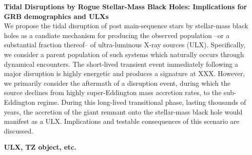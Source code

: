 {\bf Tidal Disruptions by Rogue Stellar-Mass Black Holes:  Implications for GRB demographics and ULXs}\\

We propose the tidal disruption of post main-sequence stars by stellar-mass black holes as a candiate mechanism for
producing the observed population --or a substantial fraction thereof-- of ultra-luminous X-ray sources (ULX).   Specifically, we consider a parent population of such systems which naturally occurs through dynamical encounters.  The short-lived transient event immediately following a major disruption is highly energetic and produces a signature at XXX.  However, we primarily consider the aftermath of a disruption event, during which the source declines from highly super-Eddington mass accretion rates, to the sub-Eddington regime.  During this long-lived transitional phase, lasting thousands of years, the accretion of the giant remnant onto the stellar-mass black hole would manifest as a ULX.   Implications and testable consequences of this scenario are discussed.


{\bf ULX, TZ object, etc.}

